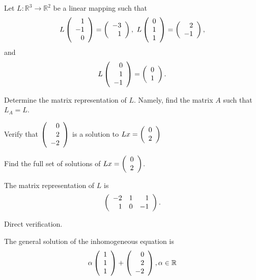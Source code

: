 \documentclass{ximera}
\begin{document}
\begin{exercise} \label{YZ_3.4.7}
Let $L:\mathbb R^3\to \mathbb R^2$ be a linear mapping such that 
\[
L\Matrix{1\\-1\\0}=\Matrix{-3\\1},~L\Matrix{0\\1\\1 }=\Matrix{2\\-1},
\]
and 
\[
L\Matrix{ 0\\1\\-1}=\Matrix{0\\1}.
\]


\begin{enumeratea}
\item Determine the matrix representation of $L$. Namely, find the matrix $A$ such that $L_A=L$.

\item Verify that  $\Matrix{0\\2\\-2}$ is a solution to $Lx=\Matrix{0\\2}$
\item Find the full set of solutions of $Lx=\Matrix{0\\2}$.
\end{enumeratea}


\begin{solution}

\ans 
\begin{enumeratea}
\item  The matrix representation of $L$ is 
 \[
\Matrix{ -2&1&1\\1&0&-1}.
\]

\item Direct verification.
\item The general solution of the inhomogeneous equation is 
\[
\alpha \Matrix{1\\1\\1}+\Matrix{0\\2\\-2}, \alpha\in \mathbb R
\]

\end{enumeratea}



\soln 


\end{solution}
\end{exercise}
\end{document}
